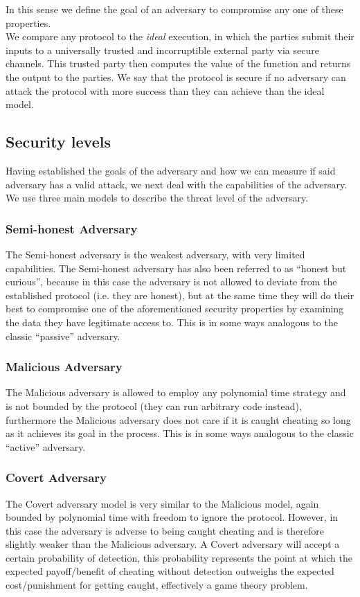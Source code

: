 \documentclass[a4paper,11pt]{article}
\begin{document}
			In this sense we define the goal of an adversary to compromise any one of these properties.\\

			We compare any protocol to the \emph{ideal} execution, in which the parties submit their inputs to a universally trusted and incorruptible external party via secure channels. This trusted party then computes the value of the function and returns the output to the parties. We say that the protocol is secure if no adversary can attack the protocol with more success than they can achieve than the ideal model.


		\subsection{Security levels}\label{sub:securityLevels}
			Having established the goals of the adversary and how we can measure if said adversary has a valid attack, we next deal with the capabilities of the adversary. We use three main models to describe the threat level of the adversary.

			\subsubsection{Semi-honest Adversary}
				The Semi-honest adversary is the weakest adversary, with very limited capabilities. The Semi-honest adversary has also been referred to as ``honest but curious'', because in this case the adversary is not allowed to deviate from the established protocol (i.e. they are honest), but at the same time they will do their best to compromise one of the aforementioned security properties by examining the data they have legitimate access to. This is in some ways analogous to the classic ``passive'' adversary.

			\subsubsection{Malicious Adversary}
				The Malicious adversary is allowed to employ any polynomial time strategy and is not bounded by the protocol (they can run arbitrary code instead), furthermore the Malicious adversary does not care if it is caught cheating so long as it achieves its goal in the process. This is in some ways analogous to the classic ``active'' adversary.

			\subsubsection{Covert Adversary}
				The Covert adversary model is very similar to the Malicious model, again bounded by polynomial time with freedom to ignore the protocol. However, in this case the adversary is adverse to being caught cheating and is therefore slightly weaker than the Malicious adversary. A Covert adversary will accept a certain probability of detection, this probability represents the point at which the expected payoff/benefit of cheating without detection outweighs the expected cost/punishment for getting caught, effectively a game theory problem.\\
\end{document}
